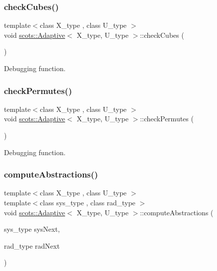 \subsubsection{\texorpdfstring{check\+Cubes()}{checkCubes()}}
{\footnotesize\ttfamily template$<$class X\+\_\+type , class U\+\_\+type $>$ \\
void \hyperlink{classscots_1_1Adaptive}{scots\+::\+Adaptive}$<$ X\+\_\+type, U\+\_\+type $>$\+::check\+Cubes (\begin{DoxyParamCaption}{ }\end{DoxyParamCaption})\hspace{0.3cm}{\ttfamily [inline]}}

Debugging function. \mbox{\label{classscots_1_1Adaptive_aba179a9fad6056239005127af2e95f45}} 
\subsubsection{\texorpdfstring{check\+Permutes()}{checkPermutes()}}
{\footnotesize\ttfamily template$<$class X\+\_\+type , class U\+\_\+type $>$ \\
void \hyperlink{classscots_1_1Adaptive}{scots\+::\+Adaptive}$<$ X\+\_\+type, U\+\_\+type $>$\+::check\+Permutes (\begin{DoxyParamCaption}{ }\end{DoxyParamCaption})\hspace{0.3cm}{\ttfamily [inline]}}

Debugging function. \mbox{\label{classscots_1_1Adaptive_af6aeb2170e7223c1396454ab2b83fb09}} 
\subsubsection{\texorpdfstring{compute\+Abstractions()}{computeAbstractions()}}
{\footnotesize\ttfamily template$<$class X\+\_\+type , class U\+\_\+type $>$ \\
template$<$class sys\+\_\+type , class rad\+\_\+type $>$ \\
void \hyperlink{classscots_1_1Adaptive}{scots\+::\+Adaptive}$<$ X\+\_\+type, U\+\_\+type $>$\+::compute\+Abstractions (\begin{DoxyParamCaption}\item[{sys\+\_\+type}]{sys\+Next,  }\item[{rad\+\_\+type}]{rad\+Next }\end{DoxyParamCaption})\hspace{0.3cm}{\ttfamily [inline]}}

